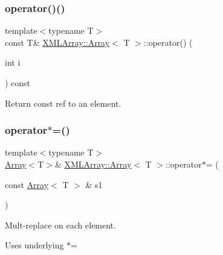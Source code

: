 \subsubsection{\texorpdfstring{operator()()}{operator()()}\hspace{0.1cm}{\footnotesize\ttfamily [6/6]}}
{\footnotesize\ttfamily template$<$typename T$>$ \\
const T\& \mbox{\hyperlink{classXMLArray_1_1Array}{X\+M\+L\+Array\+::\+Array}}$<$ T $>$\+::operator() (\begin{DoxyParamCaption}\item[{int}]{i }\end{DoxyParamCaption}) const\hspace{0.3cm}{\ttfamily [inline]}}



Return const ref to an element. 

\mbox{\label{classXMLArray_1_1Array_a866bd17aae2f3d1935f015a936ce9424}} 
\subsubsection{\texorpdfstring{operator$\ast$=()}{operator*=()}\hspace{0.1cm}{\footnotesize\ttfamily [1/6]}}
{\footnotesize\ttfamily template$<$typename T$>$ \\
\mbox{\hyperlink{classXMLArray_1_1Array}{Array}}$<$T$>$\& \mbox{\hyperlink{classXMLArray_1_1Array}{X\+M\+L\+Array\+::\+Array}}$<$ T $>$\+::operator$\ast$= (\begin{DoxyParamCaption}\item[{const \mbox{\hyperlink{classXMLArray_1_1Array}{Array}}$<$ T $>$ \&}]{s1 }\end{DoxyParamCaption})\hspace{0.3cm}{\ttfamily [inline]}}



Mult-\/replace on each element. 

Uses underlying $\ast$= \mbox{\label{classXMLArray_1_1Array_a866bd17aae2f3d1935f015a936ce9424}} 
